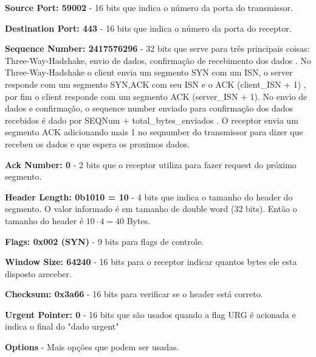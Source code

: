     
\begin{solution}
    \textbf{Source Port: 59002} - 16 bits que indica o número da porta do transmissor.
    
    \textbf{Destination Port: 443} - 16 bits que indica o número da porta do receptor.

    \textbf{Sequence Number: 2417576296} - 32 bits que serve para três principais coisas: Three-Way-Hadshake, envio de dados, confirmação de recebimento dos dados
    . No Three-Way-Hadshake o client envia um segmento SYN com um ISN, o server responde com um segmento SYN,ACK com seu ISN e o ACK (client\_ISN + 1)
    , por fim o client responde com um segmento ACK (server\_ISN + 1).
    No envio de dados  e confirmação, o sequence number enviado para confirmação dos dados recebidos é dado por SEQNum + total\_bytes\_enviados
    . O receptor envia um segmento ACK adicionando mais 1 no seqnumber do transmissor para dizer que recebeu os dados e que espera os proximos dados.

    \textbf{Ack Number: 0} - 2 bits que o receptor utiliza para fazer request do próximo segmento.

    \textbf{Header Length: 0b1010 = 10} - 4 bits que indica o tamanho do header do segmento. O valor informado é em tamanho de double word (32 bits). Então o tamanho do header é $10 \cdot 4 = 40$ Bytes.

    \textbf{Flags: 0x002 (SYN)} - 9 bits para flags de controle.

    \textbf{Window Size: 64240} - 16 bits para o receptor indicar quantos bytes ele esta disposto areceber.

    \textbf{Checksum: 0x3a66} - 16 bits para verificar se o header está correto.

    \textbf{Urgent Pointer: 0} - 16 bits que são usados quando a flag URG é acionada e indica o final do "dado urgent"

    \textbf{Options} - Mais opções que podem ser usadas.
\end{solution}
